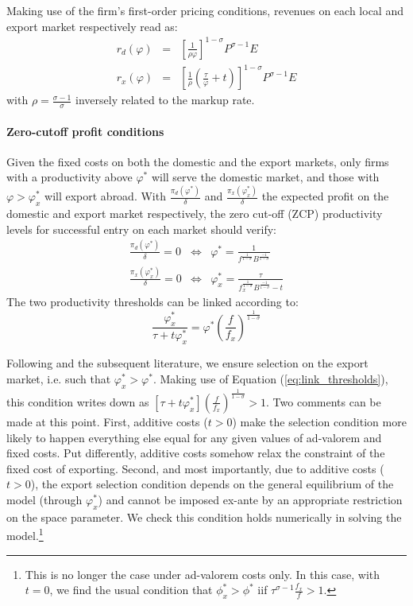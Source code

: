 \documentclass[a4paper,11pt]{article}
\begin{document}
Making use of the firm's first-order pricing conditions, revenues on each local and export market respectively read as:
\begin{eqnarray}
  r_d(\varphi) &=& \left[\frac{1}{\rho \varphi}  \right]^{1-\sigma} P^{\sigma-1} E \label{eq:rd}\\
  r_x(\varphi) &=& \left[\frac{1}{\rho}\left(\frac{\tau}{\varphi} +t\right)  \right]^{1-\sigma} P^{\sigma-1} E \label{eq:rx}
\end{eqnarray}
\noindent with $\rho =  \frac{\sigma-1}{\sigma}$ inversely related to the markup rate.

\paragraph{Zero-cutoff profit conditions} Given the fixed costs on both the domestic and the export markets, only firms with a productivity above $\varphi^\ast$ will serve the domestic market, and those with $\varphi>\varphi_x^\ast$ will export abroad. With $\frac{\pi_d(\varphi^\ast)}{\delta}$ and  $\frac{\pi_x(\varphi_x^\ast)}{\delta}$ the expected profit on the domestic and export market respectively, the zero cut-off (ZCP) productivity levels for successful entry on each market should verify:
\begin{eqnarray*}
\frac{\pi_d(\varphi^\ast)}{\delta} = 0 &\Leftrightarrow & \varphi^\ast = \frac{1}{f^{\frac{1}{1-\sigma}}B^{\frac{-1}{1-\sigma}}}\\
\frac{\pi_x(\varphi_x^\ast)}{\delta} = 0 &\Leftrightarrow & \varphi_x^\ast = \frac{\tau}{f_x^{\frac{1}{1-\sigma}}B^{\frac{-1}{1-\sigma}} -t}
\end{eqnarray*}
The two productivity thresholds can be linked according to:
\begin{equation}
\frac{\varphi_x^\ast}{\tau+t\varphi_x^\ast} = \varphi^\ast \left( \frac{f}{f_x} \right)^{\frac{1}{1-\sigma}} \label{eq:link_thresholds}
\end{equation}

Following \cite{melitz} and the subsequent literature, we ensure selection on the export market, i.e. such that $\varphi_x^\ast > \varphi^\ast$. Making use of Equation (\ref{eq:link_thresholds}), this condition writes down as $\left[\tau+ t\varphi^\ast_x \right] \left( \frac{f}{f_x} \right)^{\frac{1}{1-\sigma}} >1$. Two comments can be made at this point. First, additive costs ($t>0$) make the selection condition more likely to happen everything else equal for any given values of ad-valorem and fixed costs. Put differently, additive costs somehow relax the constraint of the fixed cost of exporting. Second, and most importantly, due to additive costs ($t>0$), the export selection condition depends on the general equilibrium of the model (through $\varphi^\ast_x $) and cannot be imposed ex-ante by an appropriate restriction on the space parameter. We check this condition holds numerically in solving the model.\footnote{This is no longer the case under ad-valorem costs only. In this case, with $t=0$, we find the usual condition that $\phi^\ast_x >\phi^\ast$ iif $\tau^{\sigma-1}\frac{f_x}{f}>1$.}
\end{document}
